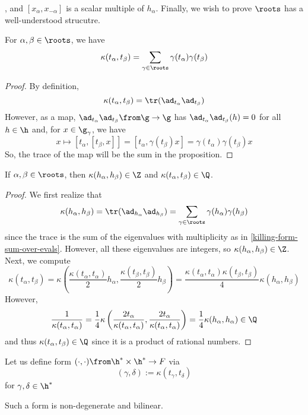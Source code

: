 \documentclass[11pt,leqno,oneside]{amsart}
\numberwithin{thm}{section}
\begin{document}
\alpha\), and \([x_\alpha, x_{-\alpha}]\) is a scalar multiple of
\(h_\alpha\). Finally, we wish to prove \(\roots\) has a
well-understood strucutre.
\begin{lem}\label{killing-form-sum-over-evals}
  For \(\alpha, \beta \in \roots\), we have \[
    \kappa(t_\alpha, t_\beta) = \sum_{\gamma \in \roots}
    \gamma(t_\alpha) \gamma(t_\beta)
  \]
\end{lem}
\begin{proof}
  By definition, \[
    \kappa(t_\alpha, t_\beta) = \tr(\ad_{t_\alpha} \ad_{t_\beta})
  \]
  However, as a map, \(\ad_{t_\alpha} \ad_{t_\beta} \from \g \to \g\)
  has \(\ad_{t_\alpha} \ad_{t_\beta}(h) = 0\) for all \(h \in \h\)
  and, for \(x \in \g_\gamma\), we have \[
    x \mapsto [t_\alpha, [t_\beta, x]] = [t_\alpha, \gamma(t_\beta)x]
    = \gamma(t_\alpha) \gamma(t_\beta)x
  \]
  So, the trace of the map will be the sum in the proposition.
\end{proof}
\begin{lem}\label{killing-form-on-roots-is-rational}
  If \(\alpha,\beta \in \roots\), then \(\kappa(h_\alpha, h_\beta) \in
  \Z\) and \(\kappa(t_\alpha, t_\beta) \in \Q\).
\end{lem}
\begin{proof}
  We first realize that \[
    \kappa(h_\alpha, h_\beta) = \tr(\ad_{h_\alpha} \ad_{h_\beta}) =
    \sum_{\gamma \in \roots} \gamma(h_\alpha)\gamma(h_\beta)
  \]
  since the trace is the sum of the eigenvalues with
  multiplicity as in \ref{killing-form-sum-over-evals}. However, all
  these eigenvalues are integers, so 
  \(\kappa(h_\alpha, h_\beta) \in \Z\). Next, we compute \[
    \kappa(t_\alpha, t_\beta) =
    \kappa \left(\frac{\kappa(t_\alpha,t_\alpha)}{2}h_\alpha,
    \frac{\kappa(t_\beta,t_\beta)}{2} h_\beta \right) =
    \frac{\kappa(t_\alpha, t_\alpha) \kappa(t_\beta,
      t_\beta)}{4}\kappa(h_\alpha, h_\beta)
  \]
  However, \[
    \frac{1}{\kappa(t_\alpha, t_\alpha)} =
    \frac{1}{4}\kappa\left(\frac{2t_\alpha}{\kappa(t_\alpha,
      t_\alpha)},\frac{2t_\alpha}{\kappa(t_\alpha, t_\alpha)}\right) =
  \frac{1}{4}\kappa(h_\alpha,h_\alpha) \in \Q
  \]
  and thus \(\kappa(t_\alpha,t_\beta) \in \Q\) since it is a product
  of rational numbers.
\end{proof}
\begin{defn}
  Let us define form \((\cdot,\cdot) \from \h^* \times \h^* \to F\)
  via \[
    (\gamma, \delta) := \kappa(t_\gamma, t_\delta)
  \]
  for \(\gamma, \delta \in \h^*\)
\end{defn}
\begin{prop}
  Such a form is non-degenerate and bilinear.
\end{prop}
\end{document}
